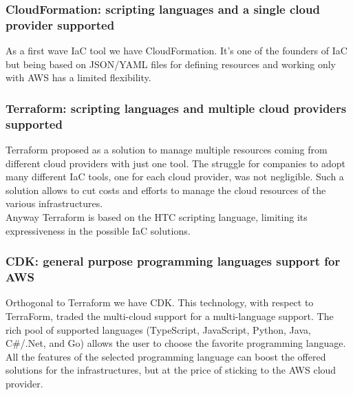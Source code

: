 \subsubsection{CloudFormation: scripting languages and a single cloud provider supported}
As a first wave IaC tool we have CloudFormation. 
It's one of the founders of IaC but being based on JSON/YAML files for defining resources and working only with AWS has a limited flexibility.\\

\subsubsection{Terraform: scripting languages and multiple cloud providers supported}
Terraform proposed as a solution to manage multiple resources coming from different cloud providers with just one tool.
The struggle for companies to adopt many different IaC tools, one for each cloud provider, was not negligible.
Such a solution allows to cut costs and efforts to manage the cloud resources of the various infrastructures.\\
Anyway Terraform is based on the HTC scripting language, limiting its expressiveness in the possible IaC solutions.

\subsubsection{CDK: general purpose programming languages support for AWS}
Orthogonal to Terraform we have CDK.
This technology, with respect to TerraForm, traded the multi-cloud support for a multi-language support.
The rich pool of supported languages (TypeScript, JavaScript, Python, Java, C\#/.Net, and Go) allows the user to choose the favorite programming language.
All the features of the selected programming language can boost the offered solutions for the infrastructures, but at the price of sticking to the AWS cloud provider.

